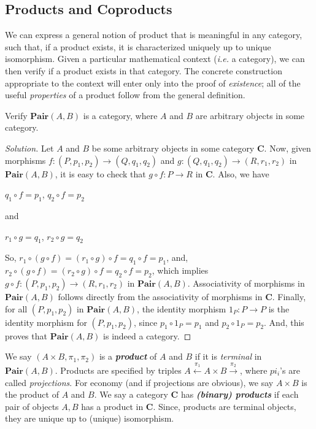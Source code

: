 \documentclass[]{amsbook}
\newcommand{\catname}[1]{\mathbf{#1}}
\newcommand{\0}{\mathbf{0}}
\newcommand{\1}{\mathbf{1}}
\newenvironment{solution}
    {\begin{proof}[Solution]}{\end{proof}}
\begin{document}
\subsection*{Products and Coproducts}
We can express a general notion of product that is meaningful in any category,
such that, if a product exists, it is characterized uniquely up to unique
isomorphism. Given a particular mathematical context (\emph{i.e.} a category),
we can then verify if a product exists in that category. The concrete
construction appropriate to the context will enter only into the proof of
\emph{existence}; all of the useful \emph{properties} of a product follow from
the general definition.

\setcounter{Exercise}{23}
\begin{Exercise}
    Verify $\catname{Pair}(A, B)$ is a category, where $A$ and $B$ are arbitrary
    objects in some category.
\end{Exercise}
\begin{solution}
    Let $A$ and $B$ be some arbitrary objects in some category $\catname{C}$.
    Now, given morphisms $f: (P, p_1, p_2) \to (Q, q_1, q_2)$ and $g: (Q, q_1,
    q_2) \to (R, r_1, r_2)$ in $\catname{Pair}(A, B)$, it is easy to check that
    $g \circ f: P \to R$ in $\catname{C}$. Also, we have
    \begin{center}
        $q_1 \circ f = p_1$, $q_2 \circ f = p_2$
    \end{center}
    and
    \begin{center}
        $r_1 \circ g = q_1$, $r_2 \circ g = q_2$
    \end{center}
    So, $r_1 \circ (g \circ f) = (r_1 \circ g) \circ f = q_1 \circ f = p_1$, and,
    $r_2 \circ (g \circ f) = (r_2 \circ g) \circ f = q_2 \circ f = p_2$, which
    implies $g \circ f: (P, p_1, p_2) \to (R, r_1, r_2)$ in $\catname{Pair}(A,B)$.
    Associativity of morphisms in $\catname{Pair}(A, B)$ follows directly from
    the associativity of morphisms in $\catname{C}$. Finally, for all
    $(P, p_1, p_2)$ in $\catname{Pair}(A, B)$, the identity morphism $1_P: P \to
    P$ is the identity morphism for $(P, p_1, p_2)$, since $p_1 \circ 1_P = p_1$
    and $p_2 \circ 1_P = p_2$. And, this proves that $\catname{Pair}(A, B)$ is
    indeed a category.
\end{solution}

We say $(A \times B, \pi_1, \pi_2)$ is a \emph{\textbf{product}} of $A$ and $B$
if it is \emph{terminal} in $\catname{Pair}(A, B)$. Products are specified by
triples $A \xleftarrow{\pi_1} A \times B \xrightarrow{\pi_2}$, where $pi_i$'s are
called \emph{projections}. For economy (and if projections are obvious), we say
$A \times B$ is the product of $A$ and $B$. We say a category $\catname{C}$ has
\emph{\textbf{(binary) products}} if each pair of objects $A, B$ has a product
in $\catname{C}$. Since, products are terminal objects, they are unique up to
(unique) isomorphism.
\end{document}
